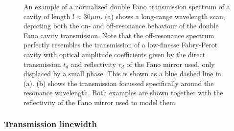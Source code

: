 \begin{figure}[h!]
\begin{subfigure}[c]{0.49\textwidth}
        \caption{}
        \label{fig:double_short_range}
    \end{subfigure}
    \caption{An example of a normalized double Fano transmission spectrum of a cavity of length $l \approx 30 \mu m$. (a) shows a long-range wavelength scan, depicting both the on- and off-resonance behaviour of the double Fano cavity transmission. Note that the off-resonance spectrum perfectly resembles the transmission of a low-finesse Fabry-Perot cavity with optical amplitude coefficients given by the direct transmission $t_d$ and reflectivity $r_d$ of the Fano mirror used, only displaced by a small phase. This is shown as a blue dashed line in (a). (b) shows the transmission focussed specifically around the resonance wavelength. Both examples are shown together with the reflectivity of the Fano mirror used to model them.}
    \label{fig:double_fano_transmission}
\end{figure}

\subsubsection{Transmission linewidth}\label{sec:double_fano_lw_theory}

